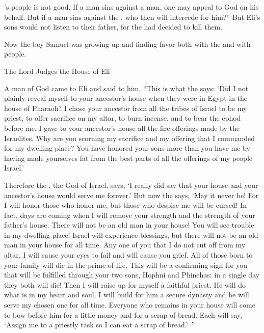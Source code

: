 {{}’s
people
is not
good.
If
a man
sins
against a man,
one
may appeal
to God
on his behalf. But if
a man
sins
against the
{}, who
then will intercede
for him?” But Eli’s sons would not
listen
to their father,
for
the {}
had decided
to kill them.
\par }{\PP {}Now the boy
Samuel
was growing
up and finding
favor both
with
the {}
and with
people.
\par }{\SH The Lord Judges the House of Eli
\par }{\PP {}A man
of God
came
to
Eli
and said
to
him, “This is what
the {}
says: ‘Did I not plainly
reveal
myself to
your ancestor’s
house
when they were
in Egypt
in the house
of Pharaoh?
I chose
your ancestor from all
the tribes
of Israel
to be my priest,
to offer
sacrifice on
my altar,
to burn
incense,
and to bear
the ephod
before
me. I gave
to your ancestor’s
house
all
the fire offerings
made by the Israelites.
Why
are you scorning
my sacrifice
and my offering
that
I commanded
for my dwelling place? You have honored
your sons
more than
you have me by having made yourselves fat
from the best parts
of all
the offerings
of my people
Israel.’
\par }{\PP {}Therefore
the {}, the God
of Israel,
says,
‘I really did say
that your house
and your ancestor’s
house
would
serve
me forever.’
But now
the {}
says,
‘May it never be! For
I will honor
those who honor
me, but those who despise
me will be cursed!
In fact,
days
are coming
when I will remove
your strength
and the strength
of your father’s
house.
There will not be
an old man
in your house!
You will see
trouble
in my dwelling place! Israel
will experience blessings,
but there will not
be
an old man
in your house
for all
time.
Any one
of you that I do not
cut off
from
my altar,
I will cause
your eyes
to fail
and will cause you grief.
All
of those born
to your family
will die
in the prime
of life.
This
will be a confirming sign
for you that
will be fulfilled
through your two
sons,
Hophni
and Phinehas: in a single
day
they both
will die!
Then I will raise up
for myself a faithful
priest.
He will do
what is in my heart
and soul.
I will build
for him a secure
dynasty
and he will serve
my chosen one
for all
time.
Everyone
who remains
in your house
will come
to bow
before him for a little
money
and for a scrap
of bread.
Each
will say,
‘Assign
me to
a priestly task
so I can eat
a scrap
of bread.’ ”

}
